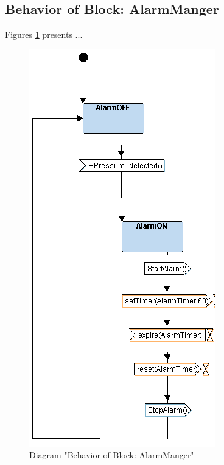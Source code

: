 \subsection{Behavior of Block: AlarmManger}
Figures \ref{fig:AlarmMangerAlarmManger23} presents ...
\begin{figure}[htb]
\centering
\includegraphics[width=\textwidth]{img_2_3.png}
\caption{Diagram "Behavior of Block: AlarmManger"}
\label{fig:AlarmMangerAlarmManger23}
\end{figure}

